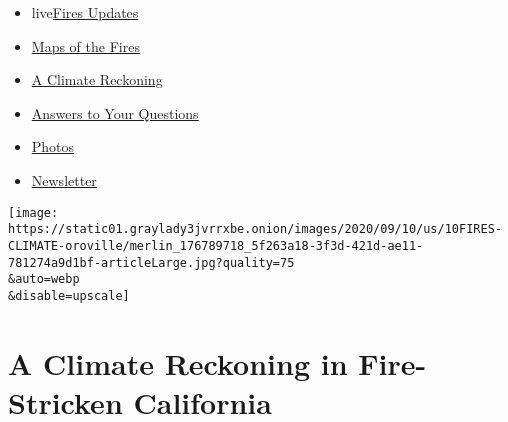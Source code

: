 \begin{itemize}
\tightlist
\item
  live\href{https://www.nytimes3xbfgragh.onion/2020/09/11/us/wildfires-live-updates.html?name=styln-california-wildfires\&region=TOP_BANNER\&block=storyline_menu_recirc\&action=click\&pgtype=Article\&impression_id=4909f1d0-f4c3-11ea-989a-419b1be2eba7\&variant=undefined}{Fires
  Updates}
\item
  \href{https://www.nytimes3xbfgragh.onion/interactive/2020/us/fires-map-tracker.html?name=styln-california-wildfires\&region=TOP_BANNER\&block=storyline_menu_recirc\&action=click\&pgtype=Article\&impression_id=4909f1d1-f4c3-11ea-989a-419b1be2eba7\&variant=undefined}{Maps
  of the Fires}
\item
  \href{https://www.nytimes3xbfgragh.onion/2020/09/10/us/climate-change-california-wildfires.html?name=styln-california-wildfires\&region=TOP_BANNER\&block=storyline_menu_recirc\&action=click\&pgtype=Article\&impression_id=4909f1d2-f4c3-11ea-989a-419b1be2eba7\&variant=undefined}{A
  Climate Reckoning}
\item
  \href{https://www.nytimes3xbfgragh.onion/article/wildfires-california-oregon-washington.html?name=styln-california-wildfires\&region=TOP_BANNER\&block=storyline_menu_recirc\&action=click\&pgtype=Article\&impression_id=4909f1d3-f4c3-11ea-989a-419b1be2eba7\&variant=undefined}{Answers
  to Your Questions}
\item
  \href{https://www.nytimes3xbfgragh.onion/article/wildfires-photos-california-oregon-washington-state.html?name=styln-california-wildfires\&region=TOP_BANNER\&block=storyline_menu_recirc\&action=click\&pgtype=Article\&impression_id=4909f1d4-f4c3-11ea-989a-419b1be2eba7\&variant=undefined}{Photos}
\item
  \href{https://www.nytimes3xbfgragh.onion/2020/09/09/us/california-wildfires.html?name=styln-california-wildfires\&region=TOP_BANNER\&block=storyline_menu_recirc\&action=click\&pgtype=Article\&impression_id=4909f1d5-f4c3-11ea-989a-419b1be2eba7\&variant=undefined}{Newsletter}
\end{itemize}

\texttt{[image: https://static01.graylady3jvrrxbe.onion/images/2020/09/10/us/10FIRES-CLIMATE-oroville/merlin\_176789718\_5f263a18-3f3d-421d-ae11-781274a9d1bf-articleLarge.jpg?quality=75\\\&auto=webp\\\&disable=upscale]}

\hypertarget{a-climate-reckoning-in-fire-stricken-california}{%
\section{A Climate Reckoning in Fire-Stricken
California}\label{a-climate-reckoning-in-fire-stricken-california}}

